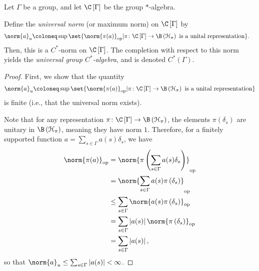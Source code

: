 \begin{proposition}\label{prop:universal_group_cstar_algebra}
  Let $\Gamma$ be a group, and let $\C\left[ \Gamma \right]$ be the group $\ast$-algebra.\newline

  Define the \textit{universal norm} (or maximum norm) on $\C\left[ \Gamma \right]$ by
  \begin{align*}
    \norm{a}_{u} &\coloneq \sup\set{\norm{\pi(a)}_{\op} | \pi\colon \C\left[ \Gamma \right]\rightarrow \B\left( \mathcal{H}_{\pi} \right)\text{ is a unital representation}}.
  \end{align*}
  Then, this is a $C^{\ast}$-norm on $\C\left[ \Gamma \right]$. The completion with respect to this norm yields the \textit{universal group $C^{\ast}$-algebra}, and is denoted $C^{\ast}\left( \Gamma \right)$.
\end{proposition}
\begin{proof}
  First, we show that the quantity
  \begin{align*}
    \norm{a}_{u}\coloneq \sup\set{\norm{\pi(a)}_{\op} | \pi\colon \C\left[ \Gamma \right]\rightarrow \B\left( \mathcal{H}_{\pi} \right)\text{ is a unital representation}}
  \end{align*}
  is finite (i.e., that the universal norm exists).\newline

  Note that for any representation $\pi\colon \C\left[ \Gamma \right]\rightarrow \B\left( \mathcal{H}_{\pi} \right)$, the elements $\pi\left( \delta_s \right)$ are unitary in $\B\left( \mathcal{H}_{\pi} \right)$, meaning they have norm $1$. Therefore, for a finitely supported function $a = \sum_{s\in\Gamma}a(s)\delta_s$, we have
  \begin{align*}
    \norm{\pi(a)}_{\op} &= \norm{\pi\left( \sum_{s\in\Gamma}a(s)\delta_s \right)}_{\op}\\
                        &= \norm{\sum_{s\in\Gamma}a(s)\pi\left( \delta_s \right)}_{\op}\\
                        &\leq \sum_{s\in\Gamma}\norm{a(s)\pi\left( \delta_s \right)}_{\op}\\
                        &= \sum_{s\in\Gamma}\left\vert a(s) \right\vert\norm{\pi\left( \delta_s \right)}_{\op}\\
                        &= \sum_{s\in\Gamma}\left\vert a(s) \right\vert,
  \end{align*}
  so that $\norm{a}_u\leq \sum_{s\in\Gamma}\left\vert a(s) \right\vert < \infty$.
\end{proof}
